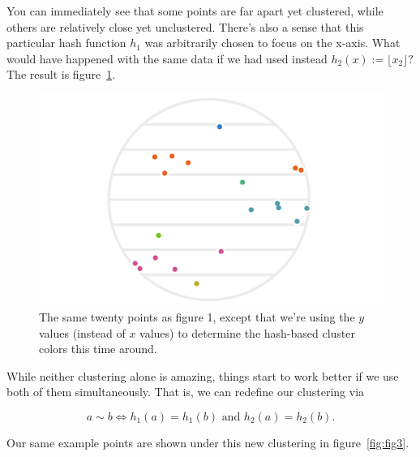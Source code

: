 \documentclass[20pt,]{extarticle}
\begin{document}
You can immediately see that some points are far apart yet clustered,
while others are relatively close yet unclustered. There's also a sense
that this particular hash function \(h_1\) was arbitrarily chosen to
focus on the x-axis. What would have happened with the same data if we
had used instead \(h_2(x) := \lfloor x_2 \rfloor?\) The result is
figure~\ref{fig:fig2}.

\begin{figure}
\centering
\includegraphics{images/lsh_image2.png}
\caption{The same twenty points as figure 1, except that we're using the
\(y\) values (instead of \(x\) values) to determine the hash-based
cluster colors this time around.}\label{fig:fig2}
\end{figure}

While neither clustering alone is amazing, things start to work better
if we use both of them simultaneously. That is, we can redefine our
clustering via

\begin{equation} a \sim b \iff h_1(a) = h_1(b) \text{ and } h_2(a) = h_2(b). \label{eq:eq1}\end{equation}

Our same example points are shown under this new clustering in
figure~\ref{fig:fig3}.
\end{document}
